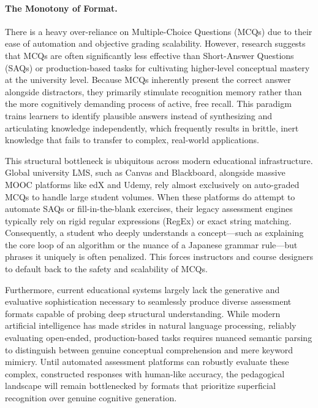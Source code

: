 \paragraph{The Monotony of Format.}
There is a heavy over-reliance on Multiple-Choice Questions (MCQs) due to their ease of automation and objective grading scalability. However, research suggests that MCQs are often significantly less effective than Short-Answer Questions (SAQs) or production-based tasks for cultivating higher-level conceptual mastery at the university level. Because MCQs inherently present the correct answer alongside distractors, they primarily stimulate recognition memory rather than the more cognitively demanding process of active, free recall. This paradigm trains learners to identify plausible answers instead of synthesizing and articulating knowledge independently, which frequently results in brittle, inert knowledge that fails to transfer to complex, real-world applications.

This structural bottleneck is ubiquitous across modern educational infrastructure. Global university LMS, such as Canvas and Blackboard, alongside massive MOOC platforms like edX and Udemy, rely almost exclusively on auto-graded MCQs to handle large student volumes. When these platforms do attempt to automate SAQs or fill-in-the-blank exercises, their legacy assessment engines typically rely on rigid regular expressions (RegEx) or exact string matching. Consequently, a student who deeply understands a concept—such as explaining the core loop of an algorithm or the nuance of a Japanese grammar rule—but phrases it uniquely is often penalized. This forces instructors and course designers to default back to the safety and scalability of MCQs.

Furthermore, current educational systems largely lack the generative and evaluative sophistication necessary to seamlessly produce diverse assessment formats capable of probing deep structural understanding. While modern artificial intelligence has made strides in natural language processing, reliably evaluating open-ended, production-based tasks requires nuanced semantic parsing to distinguish between genuine conceptual comprehension and mere keyword mimicry. Until automated assessment platforms can robustly evaluate these complex, constructed responses with human-like accuracy, the pedagogical landscape will remain bottlenecked by formats that prioritize superficial recognition over genuine cognitive generation.